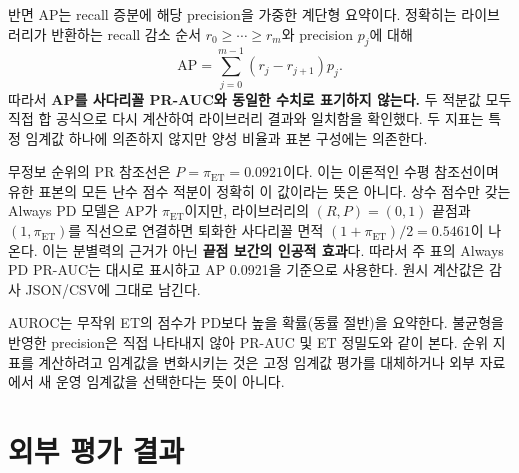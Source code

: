 \documentclass[11pt,a4paper]{article}
\begin{document}
반면 AP는 recall 증분에 해당 precision을 가중한 계단형 요약이다\cite{sklearnap}.
정확히는 라이브러리가 반환하는 recall 감소 순서 $r_0\ge\cdots\ge r_m$와
precision $p_j$에 대해
\begin{equation}
 \mathrm{AP}=\sum_{j=0}^{m-1}(r_j-r_{j+1})p_j.
\end{equation}
따라서 \textbf{AP를 사다리꼴 PR-AUC와 동일한 수치로 표기하지 않는다.}
두 적분값 모두 직접 합 공식으로 다시 계산하여 라이브러리 결과와 일치함을 확인했다.
두 지표는 특정 임계값 하나에 의존하지 않지만 양성 비율과 표본 구성에는 의존한다.

무정보 순위의 PR 참조선은 $P=\pi_{\mathrm{ET}}=0.0921$이다.
이는 이론적인 수평 참조선이며 유한 표본의 모든 난수 점수 적분이 정확히 이 값이라는 뜻은 아니다.
상수 점수만 갖는 Always PD 모델은 AP가 $\pi_{\mathrm{ET}}$이지만,
라이브러리의 $(R,P)=(0,1)$ 끝점과 $(1,\pi_{\mathrm{ET}})$를 직선으로 연결하면
퇴화한 사다리꼴 면적 $(1+\pi_{\mathrm{ET}})/2=0.5461$이 나온다.
이는 분별력의 근거가 아닌 \textbf{끝점 보간의 인공적 효과}다.
따라서 주 표의 Always PD PR-AUC는 대시로 표시하고 AP 0.0921을 기준으로 사용한다.
원시 계산값은 감사 JSON/CSV에 그대로 남긴다.

AUROC는 무작위 ET의 점수가 PD보다 높을 확률(동률 절반)을 요약한다.
불균형을 반영한 precision은 직접 나타내지 않아 PR-AUC 및 ET 정밀도와 같이 본다.
순위 지표를 계산하려고 임계값을 변화시키는 것은 고정 임계값 평가를 대체하거나
외부 자료에서 새 운영 임계값을 선택한다는 뜻이 아니다.
\clearpage

\section{외부 평가 결과}
\end{document}
